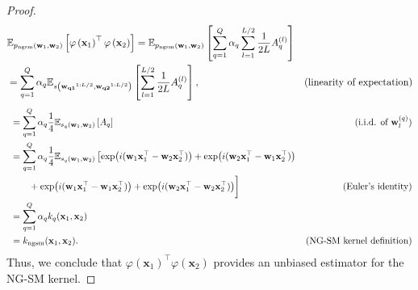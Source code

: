 \begin{proof}
\begin{equation}
    \label{eq:proof_RFF_SM}
    \begin{aligned}
        &\mathbb{E}_{p_{\text{ngsm}}\left(\mathbf{{\mathbf w}}_1, \mathbf{{\mathbf w}}_2\right)}  \left[\varphi\left( {\mathbf x}_1\right)^\top \varphi \left( {\mathbf x}_2 \right)\right] 
        =  \mathbb{E}_{p_{\text{ngsm}}\left(\mathbf{{\mathbf w}}_1, \mathbf{{\mathbf w}}_2\right)} \left[ \sum_{q=1}^Q \alpha_q \sum_{l = 1}^{L/2} \frac{1}{2 L} A_q^{(l)} \right] &   \\
        & =  \sum_{q=1}^Q \alpha_q \mathbb{E}_{s\left(\mathbf{{\mathbf w}_{q1}}^{1:L/2},\mathbf{{\mathbf w}_{q2}}^{1:L/2}\right)} \left[\sum_{l = 1}^{L/2} \frac{1}{2 L} A_q^{(l)} \right], &(\text{linearity of expectation})
 \end{aligned}
\end{equation}
\begin{equation}
    \begin{aligned}
        \ & =  \sum_{q=1}^Q \alpha_q  \frac{1}{4}\mathbb{E}_{s_q({\mathbf w}_1,{\mathbf w}_2)} \left[ A_q \right] &(\text{i.i.d. of } {\mathbf w}^{(q)}_l) \\
        & =  \sum_{q=1}^Q \alpha_q  \frac{1}{4} \mathbb{E}_{s_q({\mathbf w}_1,{\mathbf w}_2)} \left[ \exp(i({\mathbf w}_1 {\mathbf x}_1^\top - {\mathbf w}_2 {\mathbf x}_2^\top)) + \exp(i({\mathbf w}_2 {\mathbf x}_1^\top - {\mathbf w}_1 {\mathbf x}_2^\top)) \right. \\
        & \quad\quad +  \exp(i({\mathbf w}_1 {\mathbf x}_1^\top - {\mathbf w}_1 {\mathbf x}_2^\top)) + \exp(i({\mathbf w}_2 {\mathbf x}_1^\top - {\mathbf w}_2 {\mathbf x}_2^\top)) \bigg] & (\text{Euler’s identity}) \\
        & = \sum_{q=1}^Q \alpha_q k_q({\mathbf x}_1, {\mathbf x}_2)  &  \\
        & = k_{\text{ngsm}}({\mathbf x}_1, {\mathbf x}_2). & (\text{NG-SM kernel definition})
    \end{aligned}
\end{equation}
Thus, we conclude that \(\varphi\left( \mathbf{x}_1 \right)^\top \varphi\left( \mathbf{x}_2 \right)\) provides an unbiased estimator for the NG-SM kernel.

\end{proof}
\vspace{.2in}

